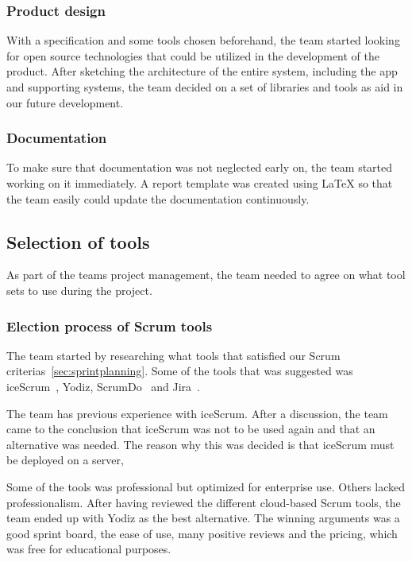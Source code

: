 \subsubsection{Product design}
With a specification and some tools chosen beforehand, the team started looking for open source technologies that could be utilized in the development of the product. After sketching the architecture of the entire system, including the app and supporting systems, the team decided on a set of libraries and tools as aid in our future development.

\subsubsection{Documentation}
To make sure that documentation was not neglected early on, the team started working on it immediately. A report template was created using LaTeX so that the team easily could update the documentation continuously.


\subsection{Selection of tools}
As part of the teams project management, the team needed to agree on what tool sets to use during the project.

\subsubsection{Election process of Scrum tools}
\label{sec:scrumtools}
The team started by researching what tools that satisfied our Scrum criterias~\ref{sec:sprintplanning}. Some of the tools that was suggested was iceScrum~\cite{icescrum}, Yodiz, ScrumDo~\cite{scrumdo} and Jira~\cite{jira}.

The team has previous experience with iceScrum. After a discussion, the team came to the conclusion that iceScrum was not to be used again and that an alternative was needed. The reason why this was decided is that iceScrum must be deployed on a server, 

Some of the tools was professional but optimized for enterprise use. Others lacked professionalism. After having reviewed the different cloud-based Scrum tools, the team ended up with Yodiz as the best alternative. The winning arguments was a good sprint board, the ease of use, many positive reviews and the pricing, which was free for educational purposes.

